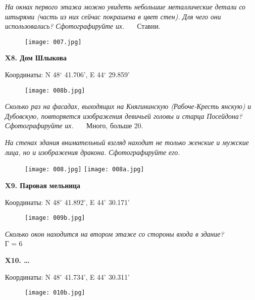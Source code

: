 \documentclass[pscyr]{hedwork}
\begin{document}
  \emph{На окнах первого этажа можно увидеть небольшие металлические детали со
  штырями (часть из них сейчас покрашена в цвет стен). Для чего они
  использовались? Сфотографируйте их.} \ \ \ Ставни.
  \begin{figure}[htbp]
    \center
    \texttt{[image: 007.jpg]}
  \end{figure}

  \pagebreak

  \textbf{X8. Дом Шлыкова}

  Координаты: N 48\( ^\circ \) 41.706', E 44\( ^\circ \) 29.859'

  \begin{figure}[htbp]
    \center
    \texttt{[image: 008b.jpg]}
  \end{figure}
  
  \emph{Сколько раз на фасадах, выходящих на Княгининскую (Рабоче-Кресть\-%
  янскую) и Дубовскую, повторяется изображения девичьей головы и старца
  Посейдона? Сфотографируйте их.} \ \ \ Много, больше 20.

  \emph{На стенах здания внимательный взгляд находит не только женские и мужские
  лица, но и изображения дракона. Сфотографируйте его.} \\

  \begin{figure}[htbp]
    \center
    \texttt{[image: 008.jpg]} \hspace{2em}
    \texttt{[image: 008a.jpg]}
  \end{figure}

  \pagebreak

  \textbf{X9. Паровая мельница}

  Координаты: N 48\( ^\circ \) 41.892', E 44\( ^\circ \) 30.171'

  \begin{figure}[htbp]
    \center
    \texttt{[image: 009b.jpg]}
  \end{figure}

  \emph{Сколько окон находится на втором этаже со стороны входа в здание?} \\
  Г = 6

  \pagebreak

  \textbf{X10. \ldots}

  Координаты: N 48\( ^\circ \) 41.734', E 44\( ^\circ \) 30.311'

  \begin{figure}[htbp]
    \center
    \texttt{[image: 010b.jpg]}
  \end{figure}
\end{document}

